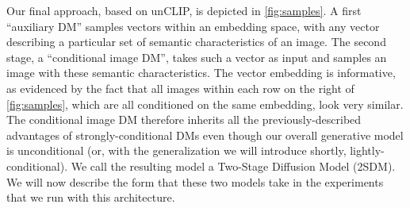 Our final approach, based on unCLIP, is depicted in \cref{fig:samples}. A first ``auxiliary DM'' samples vectors within an embedding space, with any vector describing a particular set of semantic characteristics of an image. The second stage, a ``conditional image DM'', takes such a vector as input and samples an image with these semantic characteristics. The vector embedding is informative, as evidenced by the fact that all images within each row on the right of \cref{fig:samples}, which are all conditioned on the same embedding, look very similar. The conditional image DM therefore inherits all the previously-described advantages of strongly-conditional DMs even though our overall generative model is unconditional (or, with the generalization we will introduce shortly, lightly-conditional). We call the resulting model a Two-Stage Diffusion Model (2SDM). We will now describe the form that these two models take in the experiments that we run with this architecture.

